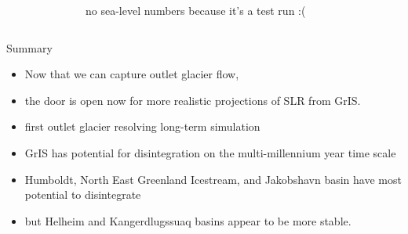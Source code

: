 \documentclass[hide notes,intlimits]{beamer}
\begin{document}
\begin{frame}
  \begin{columns}
    \column[c]{5.5cm}
    \begin{figure}
    \end{figure}
    \column[c]{6cm}
    no sea-level numbers because it's a test run :(
  \end{columns}
\end{frame}

\begin{frame}{Summary}
  \begin{itemize}
  \item Now that we can capture outlet glacier flow,
  \item the door is open now for more realistic projections of SLR from GrIS.
  \item first outlet glacier resolving long-term simulation
  \item GrIS has potential for disintegration on the multi-millennium year time scale
  \item Humboldt, North East Greenland Icestream, and Jakobshavn basin have most potential to disintegrate
  \item but Helheim and Kangerdlugssuaq basins appear to be more stable.
  \end{itemize}
\end{frame}
\end{document}

